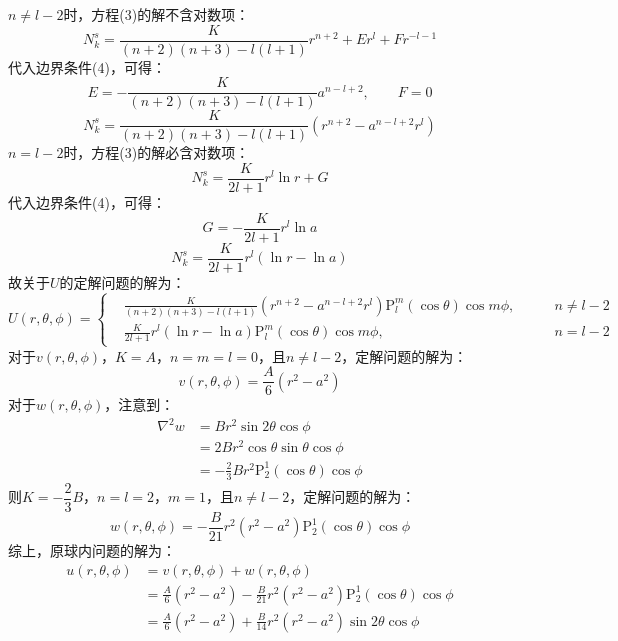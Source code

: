 \documentclass[fontset=windows]{ctexart}
\begin{document}
\begin{itemize}
    $n \neq l-2$时，方程(3)的解不含对数项：
    \[
    N_k^s = \frac{K}{(n+2)(n+3)-l(l+1)}r^{n+2} + Er^l + Fr^{-l-1}
    \]
    代入边界条件(4)，可得：
    \[
    E = -\frac{K}{(n+2)(n+3)-l(l+1)}a^{n-l+2},\qquad F = 0
    \]
    \[
    N_k^s = \frac{K}{(n+2)(n+3)-l(l+1)}\left(r^{n+2} - a^{n-l+2}r^l\right)
    \]
    $n = l-2$时，方程(3)的解必含对数项：
    \[
    N_k^s = \frac{K}{2l+1}r^l\ln{r} + G
    \]
    代入边界条件(4)，可得：
    \[
    G = -\frac{K}{2l+1}r^l\ln{a}
    \]
    \[
    N_k^s = \frac{K}{2l+1}r^l(\ln{r} - \ln{a})
    \]
    故关于$U$的定解问题的解为：
    \[
    U(r,\theta,\phi) = \left\{
    \begin{aligned}
        &\frac{K}{(n+2)(n+3)-l(l+1)}\left(r^{n+2} - a^{n-l+2}r^l\right)\mathrm{P}_l^m(\cos\theta)\cos{m\phi},\qquad &n \neq l-2 \\
        &\frac{K}{2l+1}r^l(\ln{r} - \ln{a})\mathrm{P}_l^m(\cos\theta)\cos{m\phi},\qquad &n = l-2
    \end{aligned}
    \right.
    \]
    对于$v(r,\theta,\phi)$，$K = A$，$n = m = l = 0$，且$n \neq l-2$，定解问题的解为：
    \[
    v(r,\theta,\phi) = \frac{A}{6}(r^2 - a^2)
    \]
    对于$w(r,\theta,\phi)$，注意到：
    \begin{align*}
    \nabla^2 w
    &= Br^2\sin{2\theta}\cos\phi \\
    &= 2Br^2\cos\theta\sin\theta\cos\phi \\
    &= -\frac{2}{3}Br^2\mathrm{P}_2^1(\cos\theta)\cos\phi
    \end{align*}
    则$K = -\dfrac{2}{3}B$，$n = l = 2$，$m = 1$，且$n \neq l-2$，定解问题的解为：
    \[
    w(r,\theta,\phi) = -\frac{B}{21}r^2(r^2 - a^2)\mathrm{P}_2^1(\cos\theta)\cos\phi
    \]
    综上，原球内问题的解为：
    \begin{align*}
        u(r,\theta,\phi)
        &= v(r,\theta,\phi) + w(r,\theta,\phi) \\
        &= \frac{A}{6}(r^2 - a^2) - \frac{B}{21}r^2(r^2 - a^2)\mathrm{P}_2^1(\cos\theta)\cos\phi \\
        &= \frac{A}{6}(r^2 - a^2) + \frac{B}{14}r^2(r^2 - a^2)\sin{2\theta}\cos\phi
    \end{align*}

    \end{itemize}
\end{document}
